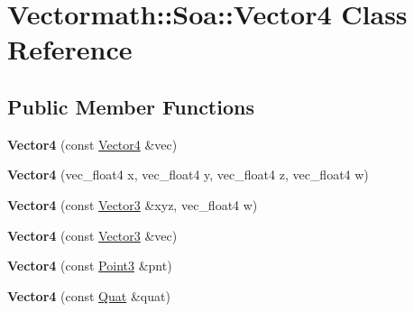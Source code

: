 \hypertarget{classVectormath_1_1Soa_1_1Vector4}{\section{Vectormath\-:\-:Soa\-:\-:Vector4 Class Reference}
\label{classVectormath_1_1Soa_1_1Vector4}
}
\subsection*{Public Member Functions}
\begin{DoxyCompactItemize}
\item 
\hypertarget{classVectormath_1_1Soa_1_1Vector4_aaea9c3da892e5251905742ded6b0e585}{{\bfseries Vector4} (const \hyperlink{classVectormath_1_1Soa_1_1Vector4}{Vector4} \&vec)}\label{classVectormath_1_1Soa_1_1Vector4_aaea9c3da892e5251905742ded6b0e585}

\item 
\hypertarget{classVectormath_1_1Soa_1_1Vector4_ad298b5e577bfcebed47f719f459fac92}{{\bfseries Vector4} (vec\-\_\-float4 x, vec\-\_\-float4 y, vec\-\_\-float4 z, vec\-\_\-float4 w)}\label{classVectormath_1_1Soa_1_1Vector4_ad298b5e577bfcebed47f719f459fac92}

\item 
\hypertarget{classVectormath_1_1Soa_1_1Vector4_ad7bffb183deb2d5adcdb0aae2c6be77c}{{\bfseries Vector4} (const \hyperlink{classVectormath_1_1Soa_1_1Vector3}{Vector3} \&xyz, vec\-\_\-float4 w)}\label{classVectormath_1_1Soa_1_1Vector4_ad7bffb183deb2d5adcdb0aae2c6be77c}

\item 
\hypertarget{classVectormath_1_1Soa_1_1Vector4_ad2b6d53e85a03711daad6673beaad26d}{{\bfseries Vector4} (const \hyperlink{classVectormath_1_1Soa_1_1Vector3}{Vector3} \&vec)}\label{classVectormath_1_1Soa_1_1Vector4_ad2b6d53e85a03711daad6673beaad26d}

\item 
\hypertarget{classVectormath_1_1Soa_1_1Vector4_a6a58e93245f9f0d21c513ad9c56ba162}{{\bfseries Vector4} (const \hyperlink{classVectormath_1_1Soa_1_1Point3}{Point3} \&pnt)}\label{classVectormath_1_1Soa_1_1Vector4_a6a58e93245f9f0d21c513ad9c56ba162}

\item 
\hypertarget{classVectormath_1_1Soa_1_1Vector4_ab92c30759ff0fbe919675479b5d0d2e6}{{\bfseries Vector4} (const \hyperlink{classVectormath_1_1Soa_1_1Quat}{Quat} \&quat)}\label{classVectormath_1_1Soa_1_1Vector4_ab92c30759ff0fbe919675479b5d0d2e6}


\end{DoxyCompactItemize}
